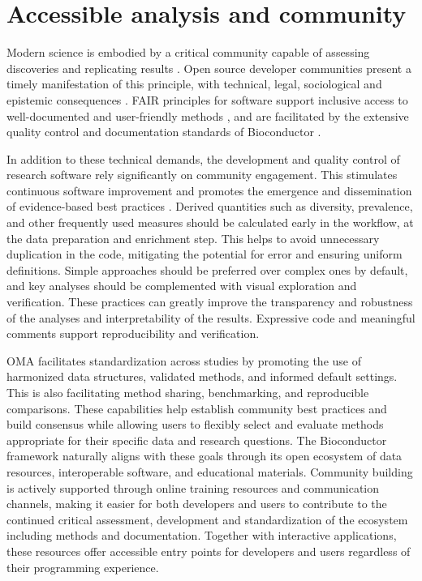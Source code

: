 \documentclass[
  sn-nature,
]{sn-jnl}
\begin{document}
\section{Accessible analysis and community}\label{sec-community}

Modern science is embodied by a critical community capable of assessing
discoveries and replicating results \citep{wootton2016}. Open source
developer communities present a timely manifestation of this principle,
with technical, legal, sociological and epistemic consequences
\citep{hocquet2024}. FAIR principles for software support inclusive
access to well-documented and user-friendly methods \citep{barker2022},
and are facilitated by the extensive quality control and documentation
standards of Bioconductor \citep{huber2015}.

In addition to these technical demands, the development and quality
control of research software rely significantly on community engagement.
This stimulates continuous software improvement and promotes the
emergence and dissemination of evidence-based best practices
\citep{berg2020, barker2022, hocquet2024}. Derived quantities such as
diversity, prevalence, and other frequently used measures should be
calculated early in the workflow, at the data preparation and enrichment
step. This helps to avoid unnecessary duplication in the code,
mitigating the potential for error and ensuring uniform definitions.
Simple approaches should be preferred over complex ones by default, and
key analyses should be complemented with visual exploration and
verification. These practices can greatly improve the transparency and
robustness of the analyses and interpretability of the results.
Expressive code and meaningful comments support reproducibility and
verification.

OMA facilitates standardization across studies by promoting the use of
harmonized data structures, validated methods, and informed default
settings. This is also facilitating method sharing, benchmarking, and
reproducible comparisons. These capabilities help establish community
best practices and build consensus while allowing users to flexibly
select and evaluate methods appropriate for their specific data and
research questions. The Bioconductor framework naturally aligns with
these goals through its open ecosystem of data resources, interoperable
software, and educational materials. Community building is actively
supported through online training resources and communication channels,
making it easier for both developers and users to contribute to the
continued critical assessment, development and standardization of the
ecosystem including methods and documentation. Together with interactive
applications, these resources offer accessible entry points for
developers and users regardless of their programming experience.
\end{document}

